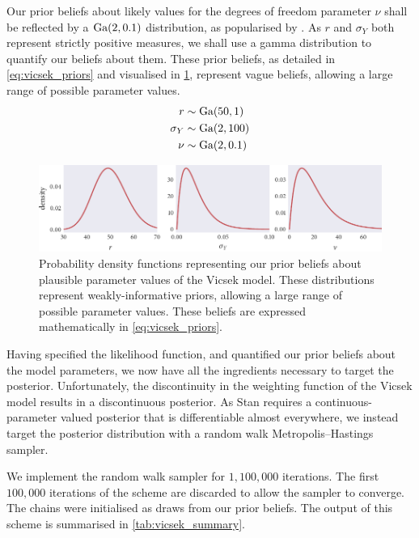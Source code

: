 Our prior beliefs about likely values for the degrees of freedom parameter
$\nu$ shall be reflected by a $\textrm{Ga}(2, 0.1)$ distribution, as popularised by
\textcite{juarez10}. As $r$ and $\sigma_Y$ both represent strictly positive
measures, we shall use a gamma distribution to quantify our beliefs about them.
These prior beliefs, as detailed in \cref{eq:vicsek_priors} and visualised in
\cref{fig:vicsek_priors}, represent vague beliefs, allowing a large range of
possible parameter values.
\begin{align}
  \label{eq:vicsek_priors}
  \begin{split}
    r           & \sim \textrm{Ga}(50, 1) \\
    \sigma_Y    & \sim \textrm{Ga}(2, 100)\\
    \nu         & \sim \textrm{Ga}(2, 0.1)
  \end{split}
\end{align}
\begin{figure}[tbp]
  \includegraphics{vicsek_priors.pdf}
  \caption{Probability density functions representing our prior beliefs about
    plausible parameter values of the Vicsek model. These distributions represent
    weakly-informative priors, allowing a large range of possible parameter
    values. These beliefs are expressed mathematically in
    \cref{eq:vicsek_priors}.}
  \label{fig:vicsek_priors}
\end{figure}

Having specified the likelihood function, and quantified our prior beliefs
about the model parameters, we now have all the ingredients necessary to target
the posterior. Unfortunately, the discontinuity in the weighting function of
the Vicsek model results in a discontinuous posterior. As Stan requires a
continuous-parameter valued posterior that is differentiable almost everywhere, we
instead target the posterior distribution with a random walk
Metropolis--Hastings sampler.

We implement the random walk sampler for $1,100,000$ iterations. The first
$100,000$ iterations of the scheme are discarded to allow the sampler to
converge. The chains were initialised as draws from our prior beliefs. The
output of this scheme is summarised in
\cref{tab:vicsek_summary}.

